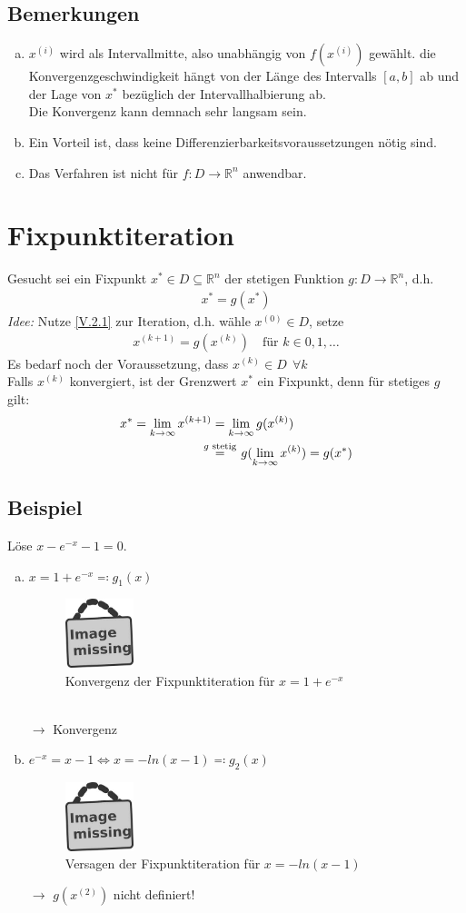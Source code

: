 \documentclass[ngerman,fontsize=11pt, paper=a4, parskip=half, titlepage=true, toc=bib]{scrbook}
\newcommand{\R}{\mathds{R}}
\newcommand{\sectione}[1]{\section{#1} \setcounter{equation}{0}}
\newcommand{\imagemissing}[1]{
	\begin{figure}
		\centering
		\includegraphics[width=2cm]{images/image_missing.jpg}
		\caption{#1}
	\end{figure}
}
\begin{document}
	\subsection{Bemerkungen}
	\begin{enumerate}[a)]
		\item $x^{(i)} $ wird als Intervallmitte, also unabhängig von $f(x^{(i)})$
		gewählt. die Konvergenzgeschwindigkeit hängt von der Länge des Intervalls $[a,b]$ ab
		und der Lage von $x^{*}$ bezüglich der Intervallhalbierung ab. \\
		Die Konvergenz kann demnach sehr langsam sein.
		\item Ein Vorteil ist, dass keine Differenzierbarkeitsvoraussetzungen nötig sind.
		\item Das Verfahren ist nicht für $f:D\longrightarrow \R^n$ anwendbar.
	\end{enumerate}
	
	
	\sectione{Fixpunktiteration}
	Gesucht sei ein Fixpunkt $x^{*}\in D\subseteq \R^n$ der stetigen Funktion
	$g:D\rightarrow\R^n$, d.h.
	\begin{gather}
		x^{*} = g(x^{*}) \label{V.2.1}
	\end{gather}
	\textit{Idee:}
	Nutze \eqref{V.2.1} zur Iteration, d.h. wähle $x^{(0)}\in D$,
	setze 
	\begin{gather}
		x^{(k+1)} = g(x^{(k)})  \quad \text{für } k\in 0, 1, \dotsc
		\label{V.2.2}
	\end{gather}
	Es bedarf noch der Voraussetzung, dass $x^{(k)}\in D~~ \forall k$ \\
	Falls $x^{(k)}$ konvergiert, ist der Grenzwert $x^{*}$ ein Fixpunkt,
	denn für stetiges $g$ gilt:
	\begin{align} \nonumber
		x^{*} = \lim_{k\rightarrow \infty}x^{(k+1)} &= \lim_{k\rightarrow \infty}g(x^{(k)}) \\
		     & \overset{\mathclap{g \text{ stetig}} }{=}\quad g(\lim_{k\rightarrow \infty}x^{(k)}) = g(x^{*})
		     \label{V.2.3}
	\end{align}
	
	\subsection{Beispiel}
	Löse $x-e^{-x}-1 = 0$.
	\begin{enumerate}[a)]
		\item $x=1+e^{-x} \eqqcolon g_1(x)$
		\imagemissing{Konvergenz der Fixpunktiteration für $x=1+e^{-x}$}\\
		$\longrightarrow$ Konvergenz
		\item $e^{-x} = x-1   \Leftrightarrow x= -ln(x-1) \eqqcolon g_2(x)$
		\imagemissing{Versagen der Fixpunktiteration für $x=-ln(x-1)$}
		$\longrightarrow$ $g(x^{(2)}) $ nicht definiert!
	\end{enumerate}
	
\end{document}
